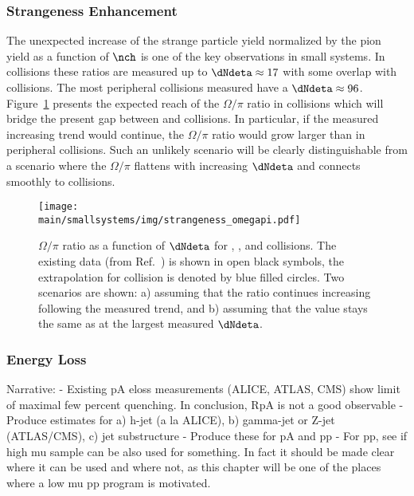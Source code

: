 \documentclass[../report.tex]{subfiles}
\providecommand{\main}{..}
\begin{document}
\subsubsection{Strangeness Enhancement}

The unexpected increase of the strange particle yield normalized by the pion yield as a function of $\nch$ is one of the key observations in small systems. In \pp collisions these ratios are measured up to $\dNdeta \approx 17$ with some overlap with \pPb collisions. The most peripheral \PbPb collisions measured have a $\dNdeta \approx 96$. Figure~\ref{fig:smallsystems_strangeness_omega_pi} presents the expected reach of the $\Omega/\pi$ ratio in \pp collisions which will bridge the present gap between \pp and \PbPb collisions. In particular, if the measured increasing trend would continue, the $\Omega/\pi$ ratio would grow larger than in peripheral \PbPb collisions. Such an unlikely scenario will be clearly distinguishable from a scenario where the $\Omega/\pi$ flattens with increasing $\dNdeta$ and connects smoothly to \PbPb collisions. 

\begin{figure}[ht]
\centering
\texttt{[image: \\main/smallsystems/img/strangeness\_omegapi.pdf]}

\caption{$\Omega/\pi$ ratio as a function of $\dNdeta$ for \pp, \pPb, and \PbPb collisions. The existing data (from Ref.~\cite{ALICE:2017jyt}) is shown in open black symbols, the extrapolation for \pp collision is denoted by blue filled circles. Two scenarios are shown: a) assuming that the ratio continues increasing following the measured trend, and b) assuming that the value stays the same as at the largest measured $\dNdeta$.}
\label{fig:smallsystems_strangeness_omega_pi}
\end{figure}

\subsubsection{Energy Loss}

Narrative: 
- Existing pA eloss measurements (ALICE, ATLAS, CMS) show limit of maximal few percent quenching. In conclusion, RpA is not a good observable
- Produce estimates for a) h-jet (a la ALICE), b) gamma-jet or Z-jet (ATLAS/CMS), c) jet substructure
- Produce these for pA and pp
- For pp, see if high mu sample can be also used for something. In fact it should be made clear where it can be used and where not, as this chapter will be one of the places where a low mu pp program is motivated.
\end{document}
